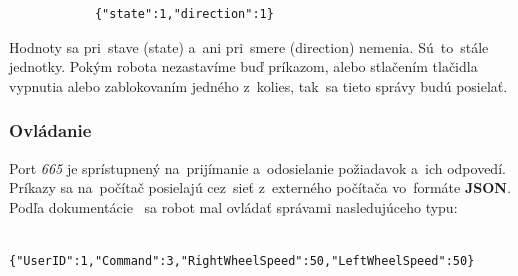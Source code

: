 	\begin{lstlisting}
			{"state":1,"direction":1}
	\end{lstlisting}

	Hodnoty sa pri~stave (state) a~ani pri~smere (direction) nemenia. Sú~to~stále jednotky. Pokým robota nezastavíme
	buď príkazom, alebo stlačením tlačidla vypnutia alebo zablokovaním jedného z~kolies, tak~sa tieto správy budú
	posielať.

\subsubsection{Ovládanie}
\label{sec:ovladanie}

	Port \textit{665} je sprístupnený na~prijímanie a~odosielanie požiadavok a~ich odpovedí. Príkazy sa na~počítač posielajú cez~sieť z~externého
	počítača vo~formáte \textbf{JSON}. Podľa dokumentácie~\cite{BMdoc} sa robot mal ovládať správami nasledujúceho typu:

	\label{jsonSpeedRequestBad}
	\begin{lstlisting}
			{"UserID":1,"Command":3,"RightWheelSpeed":50,"LeftWheelSpeed":50}
	\end{lstlisting}

	\newpage

